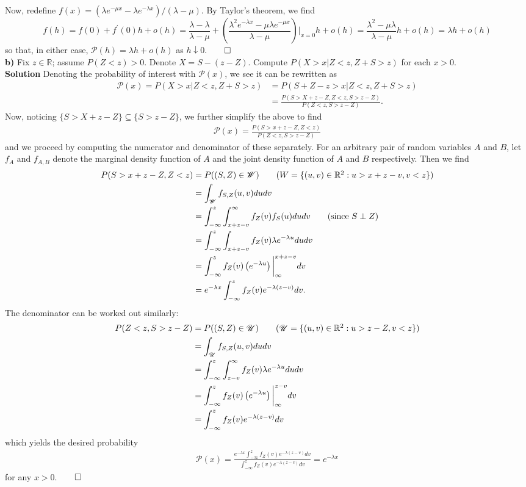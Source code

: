 \documentclass[11pt, letterpaper]{article}
\newcommand{\mbb}[1]{\mathbb{#1}}
\newcommand{\mc}[1]{\mathcal{#1}}
\begin{document}
    Now, redefine $f(x)=(\lambda e^{-\mu x}-\lambda e^{-\lambda x})/(\lambda - \mu)$. By Taylor's theorem, we find
    \[f(h)=f(0)+f^\prime(0)h+o(h)=\frac{\lambda-\lambda}{\lambda-\mu}+\left(\frac{\lambda^2 e^{-\lambda x}-\mu\lambda e^{-\mu x}}{\lambda-\mu}\right)\bigg|_{x=0}h+o(h)=\frac{\lambda^2-\mu\lambda}{\lambda-\mu}h+o(h)=\lambda h+o(h)\]
    so that, in either case, $\mc{P}(h)=\lambda h +o(h)$ as $h\downarrow 0$.\hfill{$\qed$}\\[10pt]
    {\bf b)} Fix $z\in\mbb{R}$; assume $P(Z<z)>0$. Denote $X=S-(z-Z)$. Compute $P(X>x|Z<z,Z+S>z)$ for each $x>0$.\\[10pt]
    {\bf Solution} Denoting the probability of interest with $\mc{P}(x)$, we see it can be rewritten as 
    \begin{align*}
        \mc{P}(x)=P(X>x|Z<z,Z+S>z)&=P(S+Z-z>x|Z<z,Z+S>z)\\
        &=\frac{P(S>X+z-Z,Z<z, S>z-Z)}{P(Z<z,S>z-Z)}.
    \end{align*}
    Now, noticing $\{S>X+z-Z\}\subseteq\{S>z-Z\}$, we further simplify the above to find
    \begin{align*}
        \mc{P}(x)=\frac{P(S>x+z-Z,Z<z)}{P(Z<z,S>z-Z)}
    \end{align*}
    and we proceed by computing the numerator and denominator of these separately. For an arbitrary pair of random variables $A$ and $B$, let $f_A$ and $f_{A,B}$ denote the marginal
    density function of $A$ and the joint density function of $A$ and $B$ respectively. Then we find
    \begin{align*}
        P(S>x+z-Z,Z<z)&=P((S,Z)\in\mc{W})\tag{$W=\{(u,v)\in\mbb{R}^2:u>x+z-v,v<z\}$}\\
        &=\int_{\mc{W}}f_{S,Z}(u,v)dudv\\
        &=\int_{-\infty}^z\int_{x+z-v}^\infty f_Z(v)f_S(u)dudv\tag{since $S\perp Z$}\\
        &=\int_{-\infty}^z\int_{x+z-v}f_Z(v)\lambda e^{-\lambda u}dudv\\
        &=\int_{-\infty}^zf_Z(v)\left(e^{-\lambda u}\right)\bigg|_{\infty}^{x+z-v}dv\\
        &=e^{-\lambda x}\int_{-\infty}^zf_Z(v)e^{-\lambda(z-v)}dv.
    \end{align*}
    The denominator can be worked out similarly:
    \begin{align*}
        P(Z<z,S>z-Z)&=P((S,Z)\in\mc{U})\tag{$\mc{U}=\{(u,v)\in\mbb{R}^2:u>z-Z,v<z\}$}\\
        &=\int_{\mc{U}}f_{S,Z}(u,v)dudv\\
        &=\int_{-\infty}^z\int_{z-v}^\infty f_Z(v)\lambda e^{-\lambda u}dudv\\
        &=\int_{-\infty}^zf_Z(v)\left(e^{-\lambda u}\right)\bigg|_{\infty}^{z-v}dv\\
        &=\int_{-\infty}^zf_Z(v)e^{-\lambda(z-v)}dv
    \end{align*}
    which yields the desired probability
    \begin{align*}
        \mc{P}(x)=\frac{e^{-\lambda x}\int_{-\infty}^zf_Z(v)e^{-\lambda(z-v)}dv}{\int_{-\infty}^zf_Z(v)e^{-\lambda(z-v)}dv}=e^{-\lambda x}
    \end{align*}
    for any $x>0$.\hfill{$\qed$}\\[10pt]
\end{document}
